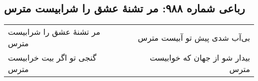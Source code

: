 \begin{center}
\section*{رباعی شماره ۹۸۸: مر تشنهٔ عشق را شرابیست مترس}
\label{sec:0988}
\begin{longtable}{l p{0.5cm} r}
مر تشنهٔ عشق را شرابیست مترس
&&
بی‌آب شدی پیش تو آبیست مترس
\\
گنجی تو اگر بیت خرابیست مترس
&&
بیدار شو از جهان که خوابیست مترس
\\
\end{longtable}
\end{center}
